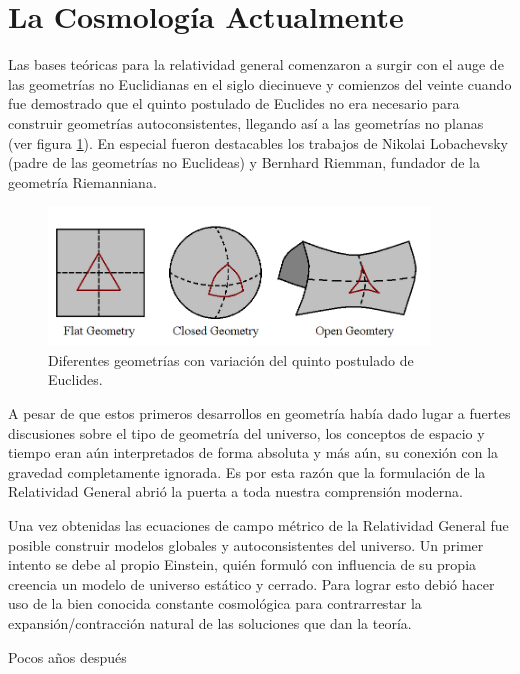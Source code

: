 \section{La Cosmología Actualmente}
\label{sec:TheCurrentCosmologyPicture}


Las bases teóricas para la relatividad general comenzaron a surgir con el 
auge de las geometrías no Euclidianas en el siglo diecinueve y comienzos 
del veinte cuando fue demostrado que el quinto postulado de Euclides no 
era necesario para construir geometrías autoconsistentes, llegando así a las
geometrías no planas (ver figura \ref{fig:NonEuclidean}). En especial fueron 
destacables los trabajos de Nikolai Lobachevsky (padre de las geometrías 
no Euclideas) y Bernhard Riemman, fundador de la geometría Riemanniana.


\begin{figure}[htbp]
	\centering
	\includegraphics[width=0.9\textwidth]{./figures/1_introduction/Non_Euclidean.png}
	
	\caption{\small{Diferentes geometrías con variación del quinto postulado 
	de Euclides.}}
	
	\label{fig:NonEuclidean}
\end{figure}


A pesar de que estos primeros desarrollos en geometría había dado lugar a
fuertes discusiones sobre el tipo de geometría del universo, los conceptos de 
espacio y tiempo eran aún interpretados de forma absoluta y más aún, su 
conexión con la gravedad completamente ignorada. Es por esta razón que 
la formulación de la Relatividad General abrió la puerta a toda nuestra
comprensión moderna.


Una vez obtenidas las ecuaciones de campo métrico de la Relatividad General
fue posible construir modelos globales y autoconsistentes del universo. Un
primer intento se debe al propio Einstein, quién formuló con influencia 
de su propia creencia un modelo de universo estático y cerrado. Para lograr 
esto debió hacer uso de la bien conocida constante cosmológica para 
contrarrestar la expansión/contracción natural de las soluciones que dan 
la teoría.


Pocos años después	






